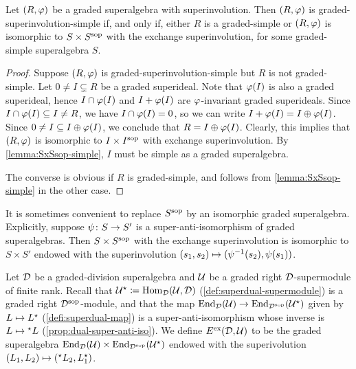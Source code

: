 \begin{prop}\label{prop:only-SxSsop-is-simple}
	Let $(R, \varphi)$ be a 
	graded superalgebra with superinvolution. 
	Then $(R, \varphi)$ is 
	graded-superinvolution-simple if, and only if, either $R$ is a graded-simple or $(R, \varphi)$ is isomorphic to $S\times S^{\mathrm{sop}}$ with the exchange superinvolution, for some graded-simple superalgebra $S$.
\end{prop}

\begin{proof}
	Suppose $(R, \varphi)$ is 
	graded-superinvolution-simple but $R$ is not graded-simple. 
	Let $0 \neq I \subsetneq R$ be a graded superideal.
	Note that $\varphi(I)$ is also a graded superideal, hence $I \cap \varphi(I)$ and $I + \varphi (I)$ are $\varphi$-invariant graded superideals. 
	Since $I \cap \varphi(I) \subseteq I \neq R$, we have $I \cap \varphi(I) = 0$, so we can write $I + \varphi (I) = I \oplus \varphi (I)$. 
	Since $0 \neq I \subseteq I \oplus \varphi (I)$, we conclude that $R = I \oplus \varphi (I)$.
	Clearly, this implies that $(R, \varphi)$ is isomorphic to $I \times I^{\mathrm{sop}}$ with exchange superinvolution. 
	By \cref{lemma:SxSsop-simple}, $I$ must be simple as a graded superalgebra. 
	
	The converse is obvious if $R$ is graded-simple, and follows from \cref{lemma:SxSsop-simple} in the other case.
\end{proof}
 
It is sometimes convenient to replace $S^{\mathrm{sop}}$ by an isomorphic graded superalgebra. 
Explicitly, suppose $\psi\colon S \to S'$ is a super-anti-isomorphism of graded superalgebras. 
Then $S\times S^{\mathrm{sop}}$ with the exchange superinvolution is isomorphic to $S\times S'$ endowed with the superinvolution $(s_1, s_2) \mapsto (\psi^{-1} (s_2), \psi (s_1))$. 

\begin{defi}\label{defi:superdual-exchange}
    Let $\mathcal{D}$ be a graded-division superalgebra and $\mathcal U$ be a graded right $\mathcal{D}$-supermodule of finite rank. 
    Recall that $\mathcal U^\star \coloneqq \operatorname{Hom}_{\mathcal{D}}(\mathcal U, \mathcal{D})$ (\cref{def:superdual-supermodule}) is a graded right $\mathcal{D}^{\mathrm{sop}}$-module, and that the map $\operatorname{End}_{\mathcal{D}} (\mathcal U) \to \operatorname{End}_{\mathcal{D}^{\mathrm{sop}}} (\mathcal U^\star)$ given by $L \mapsto L^\star$ (\cref{defi:superdual-map}) is a super-anti-isomorphism whose inverse is $L \mapsto {}^\star L$ (\cref{prop:dual-super-anti-iso}). 
    We define $E^{\mathrm{ex}} (\mathcal{D}, \mathcal U)$ to be the graded superalgebra $\operatorname{End}_{\mathcal{D}} (\mathcal U) \times \operatorname{End}_{\mathcal{D}^{\mathrm{sop}}} (\mathcal U^\star)$ endowed with the superivolution $(L_1, L_2) \mapsto ({}^\star L_2, L_1^\star)$.
\end{defi}

